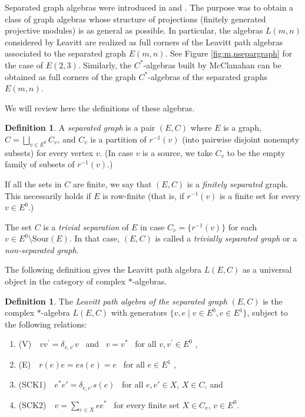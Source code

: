 \documentclass[11pt]{amsart}
\theoremstyle{plain}            %
\theoremstyle{definition}       %
\newtheorem{definition}[theorem]{Definition}
\theoremstyle{definition}       %
\theoremstyle{remark}
\newcommand{\Sour}{\mathrm{Sour}}
\begin{document}
Separated graph algebras were introduced in \cite{ag11} and \cite{ag12}. The purpose was to obtain a class of graph algebras whose structure of projections (finitely generated projective modules) is as general as possible. In particular, the algebras $L(m,n)$ considered by Leavitt \cite{Lea57, Lea62} are realized as full corners of the Leavitt path algebras associated to the separated graph $E(m,n)$. See Figure \ref{fig:m,nsepargraph} for the case of $E(2,3)$.
Similarly, the $C^*$-algebras built by McClanahan \cite{MCl92, MCl93} can be obtained as full corners of the graph $C^*$-algebras of the separated graphs $E(m,n)$. 

We will review here the definitions of these algebras. 

\begin{definition}{\rm \cite{ag12}} 
\label{defsepgraph}
	A \emph{separated graph} is a pair $(E,C)$ where $E$ is a graph,
	$C=\bigsqcup _{v\in E^ 0} C_v$, and $C_v$ is a partition of
	$r^{-1}(v)$ (into pairwise disjoint nonempty subsets) for every
	vertex $v$. (In case $v$ is a source, we take $C_v$ to be the empty
	family of subsets of $r^{-1}(v)$.)
	
	If all the sets in $C$ are finite, we say that $(E,C)$ is a
	\emph{finitely separated} graph. This necessarily holds if $E$ is
	row-finite (that is, if $r^{-1}(v)$ is a finite set for every
	$v\in E^0$.)
	
	The set $C$ is a \emph{trivial separation} of $E$ in case $C_v=
	\{r^{-1}(v)\}$ for each $v\in E^0\setminus \Sour (E)$. In that case,
	$(E,C)$ is called a \emph{trivially separated graph} or a
	\emph{non-separated graph}.
\end{definition}

The following definition gives the Leavitt path algebra $L(E,C)$
as a universal object in the category of complex $*$-algebras. 


\begin{definition}
	\label{def:LPASG} The
	{\it Leavitt path algebra of the separated graph} $(E,C)$ is the complex $*$-algebra $L(E,C)$ with
	generators $\{ v, e\mid v\in E^0, e\in E^1 \}$, subject to the
	following relations:
	\begin{enumerate}
		\item[] (V)\ \ $vv^{\prime} = \delta_{v,v^{\prime}}v$ \ and \ $v=v^*$ \ for all $v,v^{\prime} \in E^0$ ,
		\item[] (E)\ \ $r(e)e=es(e)=e$ \ for all $e\in E^1$ ,
		\item[] (SCK1)\ \ $e^*e'=\delta _{e,e'}s(e)$ \ for all $e,e'\in X$, $X\in C$, and
		\item[] (SCK2)\ \ $v=\sum _{ e\in X }ee^*$ \ for every finite set $X\in C_v$, $v\in E^0$.
	\end{enumerate}
\end{definition}
\end{document}
